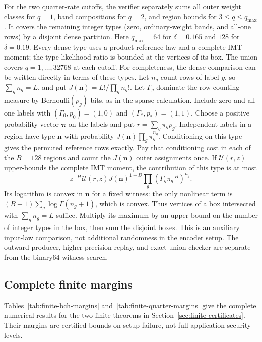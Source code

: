 For the two quarter-rate cutoffs, the verifier separately sums all outer
weight classes for $q=1$, band compositions for $q=2$, and region bounds
for $3\le q\le q_{\max}$. It covers the remaining integer types
(zero, ordinary-weight bands, and all-one rows) by a disjoint dense partition.
Here $q_{\max}=64$ for $\delta=0.165$ and $128$ for $\delta=0.19$.
Every dense type uses a product reference law and a complete IMT moment;
the type likelihood ratio is bounded at the vertices of its box.
The union covers $q=1,\ldots,32768$ at each cutoff.
For completeness, the dense comparison can be written directly in terms
of these types. Let $n_g$ count rows of label $g$, so $\sum_g n_g=L$,
and put $J(\boldsymbol n)=L!/\prod_g n_g!$.
Let $\Gamma_g$ dominate the row counting measure by Bernoulli$(p_g)$
bits, as in the sparse calculation. Include zero and all-one labels with
$(\Gamma_0,p_0)=(1,0)$ and $(\Gamma_*,p_*)=(1,1)$.
Choose a positive probability vector $\boldsymbol\pi$ on the labels and
put $r=\sum_g\pi_gp_g$. Independent labels in a region have type
$\boldsymbol n$ with probability $J(\boldsymbol n)\prod_g\pi_g^{n_g}$.
Conditioning on this type gives the permuted reference rows exactly.
Pay that conditioning cost in each of the $B=128$ regions and count
the $J(\boldsymbol n)$ outer assignments once. If $\mathcal U(r,z)$
upper-bounds the complete IMT moment, the contribution of this type is at most
\[
 z^{-H}\mathcal U(r,z)J(\boldsymbol n)^{1-B}
       \prod_g(\Gamma_g\pi_g^{-B})^{n_g}.
\]
Its logarithm is convex in $\boldsymbol n$ for a fixed witness: the only
nonlinear term is $(B-1)\sum_g\log\Gamma(n_g+1)$, which is convex.
Thus vertices of a box intersected with $\sum_g n_g=L$ suffice.
Multiply its maximum by an upper bound on the number of integer types in
the box, then sum the disjoint boxes. This is an auxiliary input-law
comparison, not additional randomness in the encoder setup.
The outward producer, higher-precision replay, and exact-union checker
are separate from the binary64 witness search.

\subsection{Complete finite margins}
\label{app:finite-margin-tables}

Tables~\ref{tab:finite-bch-margins} and~\ref{tab:finite-quarter-margins}
give the complete numerical results for the two finite theorems in
Section~\ref{sec:finite-certificates}. Their margins are certified bounds
on setup failure, not full application-security levels.

